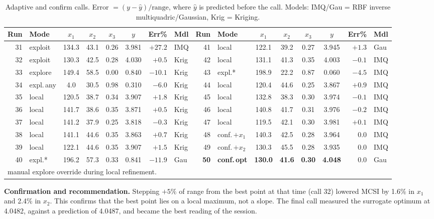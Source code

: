 \documentclass[11pt,a4paper]{article}
\begin{document}
\begin{table}[h]
\centering\small
\caption{Adaptive and confirm calls. Error $=(y-\hat y)/\text{range}$, where $\hat y$ is predicted before the call. Models: IMQ/Gau = RBF inverse multiquadric/Gaussian, Krig = Kriging.}
\label{tab:calls}
\setlength{\tabcolsep}{4pt}
\begin{tabular}{rlccccrl@{\hspace{1.2em}}rlccccrl}
\toprule
Run & Mode & $x_1$ & $x_2$ & $x_3$ & $y$ & Err\% & Mdl &
Run & Mode & $x_1$ & $x_2$ & $x_3$ & $y$ & Err\% & Mdl\\
\midrule
31 & exploit & 134.3 & 43.1 & 0.26 & 3.981 & $+27.2$ & IMQ  & 41 & local   & 122.1 & 39.2 & 0.27 & 3.945 & $+1.3$ & Gau\\
32 & exploit & 130.3 & 42.5 & 0.28 & 4.030 & $+0.5$  & Krig & 42 & local   & 131.1 & 41.3 & 0.35 & 4.003 & $-0.1$ & IMQ\\
33 & explore & 149.4 & 58.5 & 0.00 & 0.840 & $-10.1$ & Krig & 43 & expl.*  & 198.9 & 22.2 & 0.87 & 0.060 & $-4.5$ & IMQ\\
34 & expl.\,any & 4.0 & 30.5 & 0.98 & 0.310 & $-6.0$ & Krig & 44 & local   & 120.4 & 44.6 & 0.25 & 3.867 & $+0.9$ & IMQ\\
35 & local   & 120.5 & 38.7 & 0.34 & 3.907 & $+1.8$  & Krig & 45 & local   & 132.8 & 38.3 & 0.30 & 3.974 & $-0.1$ & IMQ\\
36 & local   & 141.7 & 38.6 & 0.35 & 3.871 & $+0.5$  & Krig & 46 & local   & 140.8 & 41.7 & 0.31 & 3.976 & $-0.2$ & IMQ\\
37 & local   & 141.2 & 37.9 & 0.25 & 3.818 & $-0.3$  & Krig & 47 & local   & 119.5 & 42.1 & 0.30 & 3.981 & $+0.1$ & IMQ\\
38 & local   & 141.1 & 44.6 & 0.35 & 3.863 & $+0.7$  & Krig & 48 & conf.\,$+x_1$ & 140.3 & 42.5 & 0.28 & 3.964 & $0.0$ & IMQ\\
39 & local   & 122.1 & 44.6 & 0.35 & 3.907 & $+1.5$  & Krig & 49 & conf.\,$+x_2$ & 130.3 & 45.5 & 0.28 & 3.935 & $0.0$ & IMQ\\
40 & expl.*  & 196.2 & 57.3 & 0.33 & 0.841 & $-11.9$ & Gau  & \textbf{50} & \textbf{conf.\,opt} & \textbf{130.0} & \textbf{41.6} & \textbf{0.30} & \textbf{4.048} & $0.0$ & Gau\\
\bottomrule
\multicolumn{16}{l}{\footnotesize * manual explore override during local refinement.}
\end{tabular}
\end{table}

\textbf{Confirmation and recommendation.}
Stepping $+5\%$ of range from the best point at that time (call 32) lowered MCSI by 1.6\% in $x_1$ and 2.4\% in $x_2$.
This confirms that the best point lies on a local maximum, not a slope.
The final call measured the surrogate optimum at 4.0482, against a prediction of 4.0487, and became the best reading of the session.
\end{document}
